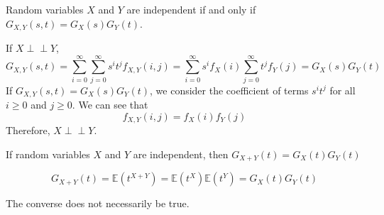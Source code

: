 \documentclass{huhtakm-template-book}
\newcommand{\independent}{\perp\!\!\!\perp}
\newcommand{\expect}{\mathbb{E}}
\begin{document}
\begin{thm}
	Random variables $X$ and $Y$ are independent if and only if $G_{X,Y}(s,t)=G_{X}(s)G_{Y}(t)$.
\end{thm}
\begin{proofing}
	If $X\independent Y$,
	\begin{equation*}
		G_{X,Y}(s,t)=\sum_{i=0}^{\infty}\sum_{j=0}^{\infty}s^{i}t^{j}f_{X,Y}(i,j)=\sum_{i=0}^{\infty}s^{i}f_{X}(i)\sum_{j=0}^{\infty}t^{j}f_{Y}(j)=G_{X}(s)G_{Y}(t)
	\end{equation*}
	If $G_{X,Y}(s,t)=G_{X}(s)G_{Y}(t)$, we consider the coefficient of terms $s^{i}t^{j}$ for all $i\geq 0$ and $j\geq 0$. We can see that
	\begin{equation*}
		f_{X,Y}(i,j)=f_{X}(i)f_{Y}(j)
	\end{equation*}
	Therefore, $X\independent Y$.
\end{proofing}
\begin{thm}
	If random variables $X$ and $Y$ are independent, then $G_{X+Y}(t)=G_{X}(t)G_{Y}(t)$
\end{thm}
\begin{proofing}
	\begin{equation*}
		G_{X+Y}(t)=\expect(t^{X+Y})=\expect(t^{X})\expect(t^{Y})=G_{X}(t)G_{Y}(t)
	\end{equation*}
\end{proofing}
\begin{rem}
	The converse does not necessarily be true.
\end{rem}
\end{document}
